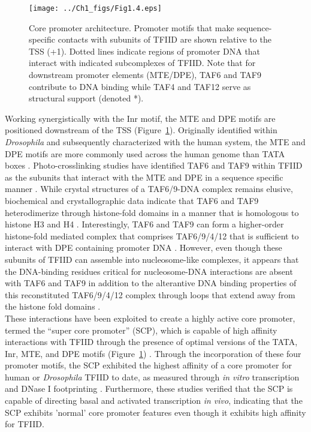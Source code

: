 \begin{figure}
\centering
\texttt{[image: ../Ch1\_figs/Fig1.4.eps]}
\caption[Core promoter architecture]{Core promoter architecture. Promoter motifs that make sequence-specific contacts with subunits of TFIID are shown relative to the TSS (+1).  Dotted lines indicate regions of promoter DNA that interact with indicated subcomplexes of TFIID.  Note that for downstream promoter elements (MTE/DPE), TAF6 and TAF9 contribute to DNA binding while TAF4 and TAF12 serve as structural support (denoted *).}
\label{fig:Fig1.4}
\end{figure}
\indent Working synergistically with the Inr motif, the MTE and DPE motifs are positioned downstream of the TSS (Figure~\ref{fig:Fig1.4}). Originally identified within \emph{Drosophila} and subsequently characterized with the human system, the MTE and DPE motifs are more commonly used across the human genome than TATA boxes \cite{Kim_1387}. Photo-crosslinking studies have identified TAF6 and TAF9 within TFIID as the subunits that interact with the MTE and DPE in a sequence specific manner \cite{Burke_2739,Lim_1522}. While crystal structures of a TAF6/9-DNA complex remains elusive, biochemical and crystallographic data indicate that TAF6 and TAF9 heterodimerize through histone-fold domains in a manner that is homologous to histone H3 and H4 \cite{Xie_2805,Hoffmann_2911}. Interestingly, TAF6 and TAF9 can form a higher-order histone-fold mediated complex that comprises TAF6/9/4/12 that is sufficient to interact with DPE containing promoter DNA \cite{Shao_1340}. However, even though these subunits of TFIID can assemble into nucleosome-like complexes, it appears that the DNA-binding residues critical for nucleosome-DNA interactions are absent with TAF6 and TAF9 in addition to the alterantive DNA binding properties of this reconstituted TAF6/9/4/12 complex through loops that extend away from the histone fold domains \cite{Shao_1340}. \\
\indent These interactions have been exploited to create a highly active core promoter, termed the “super core promoter” (SCP), which is capable of high affinity interactions with TFIID through the presence of optimal versions of the TATA, Inr, MTE, and DPE motifs (Figure~\ref{fig:Fig1.4}) \cite{Juven-Gershon_1249}. Through the incorporation of these four promoter motifs, the SCP exhibited the highest affinity of a core promoter for human or \emph{Drosophila} TFIID to date, as measured through \emph{in vitro} transcription and DNase I footprinting \cite{Juven-Gershon_1249}. Furthermore, these studies verified that the SCP is capable of directing basal and activated transcription \emph{in vivo}, indicating that the SCP exhibits 'normal' core promoter features even though it exhibits high affinity for TFIID. 




